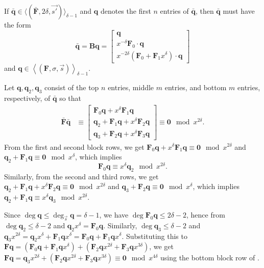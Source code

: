 \begin{lem}
\label{lem:A_delta-1Form}If $\bar{\mathbf{q}}\in\langle(\bar{\mathbf{F}},2\delta,\vec{s'})\rangle_{\delta-1}$
and $\mathbf{q}$ denotes the first $n$ entries of $\bar{\mathbf{q}}$,
then $\bar{\mathbf{q}}$ must have the form \[
\bar{\mathbf{q}}=\mathbf{B}\mathbf{q}=\left[\begin{array}{r}
\mathbf{q}\\
x^{-\delta}\mathbf{F}_{0}\cdot\mathbf{q}\\
x^{-2\delta}\left(\mathbf{F}_{0}+\mathbf{F}_{1}x^{\delta}\right)\cdot\mathbf{q}\end{array}\right]\]
 and $\mathbf{q}\in\left\langle \left(\mathbf{F},\sigma,\vec{s}\right)\right\rangle _{\delta-1}$.\end{lem}
\begin{pf}
Let $\mathbf{q},\mathbf{q}_{2},\mathbf{q}_{3}$ consist of the top
$n$ entries, middle $m$ entries, and bottom $m$ entries, respectively,
of $\mathbf{\bar{\mathbf{q}}}$ so that \begin{align}
\bar{\mathbf{F}}\bar{\mathbf{q}} & \equiv\left[\begin{array}{r}
\mathbf{F}_{0}\mathbf{q}+x^{\delta}\mathbf{F}_{1}\mathbf{q}\\
\mathbf{q}_{2}+\mathbf{F}_{1}\mathbf{q}+x^{\delta}\mathbf{F}_{2}\mathbf{q}\\
\mathbf{q}_{3}+\mathbf{F}_{2}\mathbf{q}+x^{\delta}\mathbf{F}_{3}\mathbf{q}\end{array}\right]\equiv\mathbf{0}\mod x^{2\delta}.\label{eq:Aq}\end{align}
 From the first and second block rows, we get $\mathbf{F}_{0}\mathbf{q}+x^{\delta}\mathbf{F}_{1}\mathbf{q}\equiv\mathbf{0}\mod x^{2\delta}$
and $\mathbf{q}_{2}+\mathbf{F}_{1}\mathbf{q}\equiv\mathbf{0}\mod x^{\delta}$,
which implies \begin{equation}
\mathbf{F}_{0}\mathbf{q}\equiv x^{\delta}\mathbf{q}_{2}\mod x^{2\delta}.\label{eq:q1q2}\end{equation}
 Similarly, from the second and third rows, we get $\mathbf{q}_{2}+\mathbf{F}_{1}\mathbf{q}+x^{\delta}\mathbf{F}_{2}\mathbf{q}\equiv\mathbf{0}\mod x^{2\delta}$
and $\mathbf{q}_{3}+\mathbf{F}_{2}\mathbf{q}\equiv\mathbf{0}\mod x^{\delta}$,
which implies $\mathbf{q}_{2}+\mathbf{F}_{1}\mathbf{q}\equiv x^{\delta}\mathbf{q}_{3}\mod x^{2\delta}$.

Since $\deg\mathbf{q}\le\deg_{\vec{s}}\mathbf{q}=\delta-1$, we have
$\deg\mathbf{F}_{0}\mathbf{q}\le2\delta-2$, hence from 
$\deg\mathbf{q}_{2}\le\delta-2$ and $\mathbf{q}_{2}x^{\delta}=\mathbf{F}_{0}\mathbf{q}$.
Similarly, $\deg\mathbf{q}_{3}\le\delta-2$ and $\mathbf{q}_{3}x^{2\delta}=\mathbf{q}_{2}x^{\delta}+\mathbf{F}_{1}\mathbf{q}x^{\delta}=\mathbf{F}_{0}\mathbf{q}+\mathbf{F}_{1}\mathbf{q}x^{\delta}$.
Substituting this to $\mathbf{F}\mathbf{q}=(\mathbf{F}_{0}\mathbf{q}+\mathbf{F}_{1}\mathbf{q}x^{\delta})+(\mathbf{F}_{2}\mathbf{q}x^{2\delta}+\mathbf{F}_{3}\mathbf{q}x^{3\delta})$,
we get $\mathbf{F}\mathbf{q}=\mathbf{q}_{3}x^{2\delta}+(\mathbf{F}_{2}\mathbf{q}x^{2\delta}+\mathbf{F}_{3}\mathbf{q}x^{3\delta})\equiv\mathbf{0}\mod x^{4\delta}$
using the bottom block row of .\end{pf}
